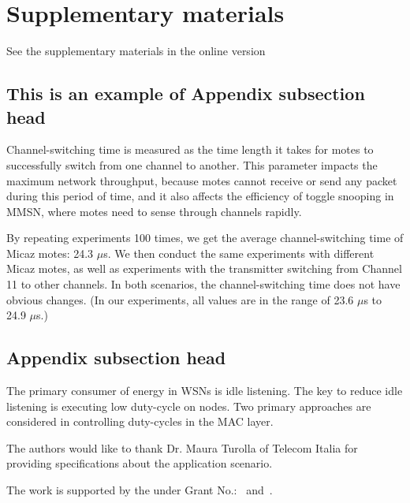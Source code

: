 \section{Supplementary materials}


\begin{printonly}
  See the supplementary materials in the online version
\end{printonly}

\begin{screenonly}
\subsection{This is an example of Appendix subsection head}

Channel-switching time is measured as the time length it takes for
motes to successfully switch from one channel to another. This
parameter impacts the maximum network throughput, because motes
cannot receive or send any packet during this period of time, and it
also affects the efficiency of toggle snooping in MMSN, where motes
need to sense through channels rapidly.

By repeating experiments 100 times, we get the average
channel-switching time of Micaz motes: 24.3 $\mu$s. We then conduct
the same experiments with different Micaz motes, as well as
experiments with the transmitter switching from Channel 11 to other
channels. In both scenarios, the channel-switching time does not have
obvious changes. (In our experiments, all values are in the range of
23.6 $\mu$s to 24.9 $\mu$s.)

\subsection{Appendix subsection head}

The primary consumer of energy in WSNs is idle listening. The key to
reduce idle listening is executing low duty-cycle on nodes. Two
primary approaches are considered in controlling duty-cycles in the
MAC layer.
  
\end{screenonly}

\begin{acks}

The authors would like to thank Dr. Maura Turolla of Telecom
Italia for providing specifications about the application scenario.

The work is supported by the  under Grant
No.:~
and~.


\end{acks}



